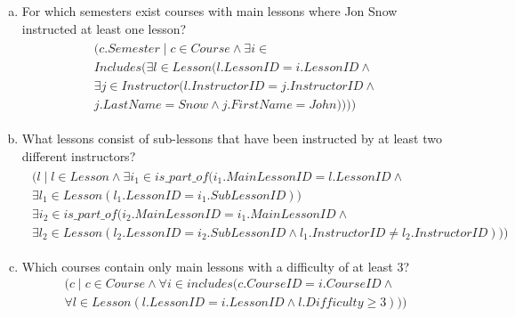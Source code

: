 \documentclass{article}
\begin{document}
\begin{enumerate}[(a)]
\item For which semesters exist courses with main lessons where Jon Snow instructed at least one lesson?
\begin{align}
    \begin{split}
   (c.Semester \mid c \in Course\wedge\exists i \in \\
   Includes(\exists l \in Lesson(l.LessonID = i.LessonID \wedge \\
   \exists j \in Instructor (l.InstructorID = j.InstructorID \wedge \\ 
   j.LastName=Snow \wedge j.FirstName = John))))
    \end{split}
\end{align}

\item What lessons consist of sub-lessons that have been instructed by at least two different instructors?
\begin{align}
    \begin{split}
   (l \mid l \in Lesson \wedge \exists i_1 \in is\_part\_of (i_1.MainLessonID=l.LessonID\wedge \\
   \exists l_1 \in Lesson(l_1.LessonID=i_1.SubLessonID))\\
   \exists i_2 \in is\_part\_of (i_2.MainLessonID=i_1.MainLessonID\wedge \\
   \exists l_2 \in Lesson(l_2.LessonID=i_2.SubLessonID\wedge l_1.InstructorID \neq l_2.InstructorID)))
    \end{split}
\end{align}

\item Which courses contain only main lessons with a difficulty of at least 3?
\begin{equation}
    \begin{split}
    (c \mid c \in Course \wedge \forall i\in includes(c.CourseID = i.CourseID \wedge \\
    \forall l \in Lesson(l.LessonID=i.LessonID\wedge l.Difficulty \geq 3)))
    \end{split}
\end{equation}


\end{enumerate}
\end{document}
